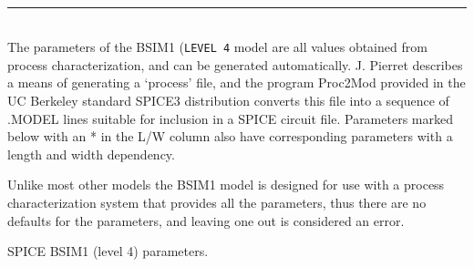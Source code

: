 {\\
\noindent\rule{\textwidth}{0.5mm}\\[0.2in]

The parameters of the BSIM1 ({\tt LEVEL 4} model are  all  values
obtained  from process  characterization,  and  can  be generated
automatically. J. Pierret \cite{pierret:84} describes a  means  of
generating  a `process'  file,  and  the  program  Proc2Mod
provided in the UC Berkeley standard SPICE3 distribution converts
this file  into  a  sequence  of  .MODEL lines  suitable  for
inclusion  in  a  SPICE  circuit file. Parameters marked below
with an * in  the  L/W  column  also have corresponding parameters
with a length and width dependency.


Unlike most other models the  BSIM1 model  is  designed  for use
with a process characterization system that provides all the
parameters, thus there  are  no defaults  for  the  parameters,
and leaving one out is considered an error.
\begin{table}[hbt]
\caption{SPICE BSIM1 (level 4) parameters. \label{bsim1table}}
\end{table}

}
